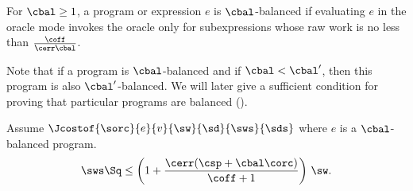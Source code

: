 \begin{definition}
For $\cbal \ge 1$, a program or expression $e$ is $\cbal$-balanced if
evaluating $e$ in the oracle mode invokes the oracle only for
subexpressions whose raw work is no less than
$\frac{\coff}{\cerr\cbal}$.
\end{definition}
%

Note that if a program is $\cbal$-balanced and 
if $\cbal < \cbal'$, then this program is also $\cbal'$-balanced.
We will later give a sufficient condition for
proving that particular programs are balanced ().


\begin{theorem}
\label{thm:orc-cost-work}
\label{thm:real-orc-work}
Assume $\Jcostof{\sorc}{ e }{v}{\sw}{\sd}{\sws}{\sds}$ where $e$ is
a $\cbal$-balanced program.
\[
\sws \Sq\leq \left(1+\frac{\cerr(\csp+\cbal\corc)}{\coff+1} \right)\,{\sw}.
\]

\end{theorem}

